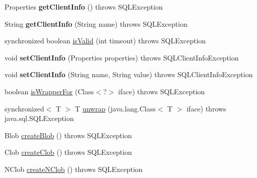 \begin{DoxyCompactItemize}
Properties {\bfseries get\+Client\+Info} ()  throws S\+Q\+L\+Exception 
\item 
\mbox{\label{classcom_1_1mysql_1_1jdbc_1_1jdbc2_1_1optional_1_1_j_d_b_c4_connection_wrapper_a1db756ea61fc57cc7f217ca4d1c50310}} 
String {\bfseries get\+Client\+Info} (String name)  throws S\+Q\+L\+Exception 
\item 
synchronized boolean \mbox{\hyperlink{classcom_1_1mysql_1_1jdbc_1_1jdbc2_1_1optional_1_1_j_d_b_c4_connection_wrapper_ad6c2f0703c78ea5fd1945088738a166c}{is\+Valid}} (int timeout)  throws S\+Q\+L\+Exception 
\item 
\mbox{\label{classcom_1_1mysql_1_1jdbc_1_1jdbc2_1_1optional_1_1_j_d_b_c4_connection_wrapper_a6a2e80daab103816eb1c9009e48fd47b}} 
void {\bfseries set\+Client\+Info} (Properties properties)  throws S\+Q\+L\+Client\+Info\+Exception 
\item 
\mbox{\label{classcom_1_1mysql_1_1jdbc_1_1jdbc2_1_1optional_1_1_j_d_b_c4_connection_wrapper_afe6f8b143f655c456f053a9f74907d66}} 
void {\bfseries set\+Client\+Info} (String name, String value)  throws S\+Q\+L\+Client\+Info\+Exception 
\item 
boolean \mbox{\hyperlink{classcom_1_1mysql_1_1jdbc_1_1jdbc2_1_1optional_1_1_j_d_b_c4_connection_wrapper_a0192ce28620a4eb27512c5a15534c8bc}{is\+Wrapper\+For}} (Class$<$?$>$ iface)  throws S\+Q\+L\+Exception 
\item 
synchronized$<$ T $>$ T \mbox{\hyperlink{classcom_1_1mysql_1_1jdbc_1_1jdbc2_1_1optional_1_1_j_d_b_c4_connection_wrapper_aad3da1c38431039875192348e78b7847}{unwrap}} (java.\+lang.\+Class$<$ T $>$ iface)  throws java.\+sql.\+S\+Q\+L\+Exception 
\item 
Blob \mbox{\hyperlink{classcom_1_1mysql_1_1jdbc_1_1jdbc2_1_1optional_1_1_j_d_b_c4_connection_wrapper_a6efcd7b2896ea5dcc91f1dd143185e7b}{create\+Blob}} ()  throws S\+Q\+L\+Exception 
\item 
Clob \mbox{\hyperlink{classcom_1_1mysql_1_1jdbc_1_1jdbc2_1_1optional_1_1_j_d_b_c4_connection_wrapper_a94e0a9cb6086e41ef826cba24607a0cf}{create\+Clob}} ()  throws S\+Q\+L\+Exception 
\item 
N\+Clob \mbox{\hyperlink{classcom_1_1mysql_1_1jdbc_1_1jdbc2_1_1optional_1_1_j_d_b_c4_connection_wrapper_a98f515567fbb11660298e3e53d8e6d3a}{create\+N\+Clob}} ()  throws S\+Q\+L\+Exception 
\end{DoxyCompactItemize}
